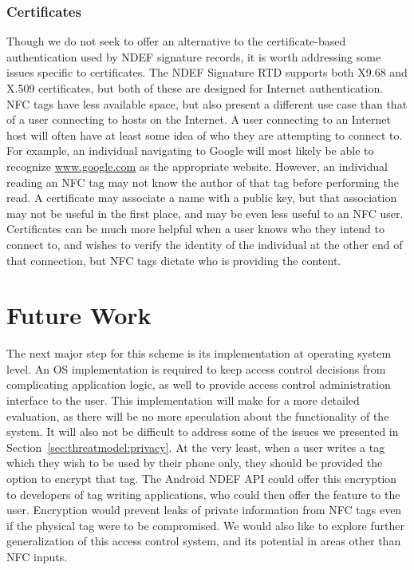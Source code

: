 \documentclass[12pt]{article}
\begin{document}
\subsubsection{Certificates}
Though we do not seek to offer an alternative to the certificate-based authentication used by NDEF signature records, it is worth addressing some issues specific to certificates.
The NDEF Signature RTD supports both X9.68 and X.509 certificates, but both of these are designed for Internet authentication.
NFC tags have less available space, but also present a different use case than that of a user connecting to hosts on the Internet.
A user connecting to an Internet host will often have at least some idea of who they are attempting to connect to.
For example, an individual navigating to Google will most likely be able to recognize \url{www.google.com} as the appropriate website.
However, an individual reading an NFC tag may not know the author of that tag before performing the read.
A certificate may associate a name with a public key, but that association may not be useful in the first place\cite{ellison2000}, and may be even less useful to an NFC user.
Certificates can be much more helpful when a user knows who they intend to connect to, and wishes to verify the identity of the individual at the other end of that connection, but NFC tags dictate who is providing the content.

\section{Future Work}
\label{sec:futurework}
The next major step for this scheme is its implementation at operating system level.
An OS implementation is required to keep access control decisions from complicating application logic, as well to provide access control administration interface to the user.
This implementation will make for a more detailed evaluation, as there will be no more speculation about the functionality of the system.
It will also not be difficult to address some of the issues we presented in Section~\ref{sec:threatmodel:privacy}.
At the very least, when a user writes a tag which they wish to be used by their phone only, they should be provided the option to encrypt that tag.
The Android NDEF API could offer this encryption to developers of tag writing applications, who could then offer the feature to the user.
Encryption would prevent leaks of private information from NFC tags even if the physical tag were to be compromised.
We would also like to explore further generalization of this access control system, and its potential in areas other than NFC inputs.
\end{document}
